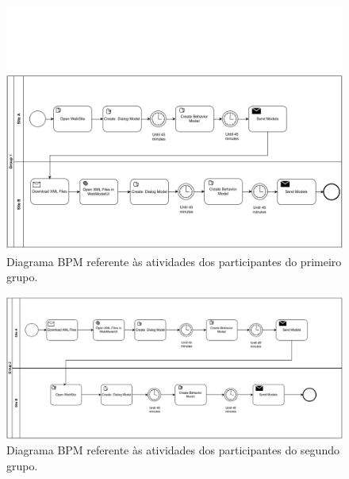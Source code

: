 \begin{landscape}

\begin{figure}[!ht]
\centering
\includegraphics[scale=0.7]{images/grupo01.png}
\caption{Diagrama BPM referente às atividades dos participantes do primeiro grupo.}
\label{g1}
\end{figure}



\begin{figure}[!ht]
\centering
\includegraphics[scale=0.7]{images/grupo02.png}
\caption{Diagrama BPM referente às atividades dos participantes do segundo grupo.}
\label{g2}
\end{figure}


\end{landscape}




